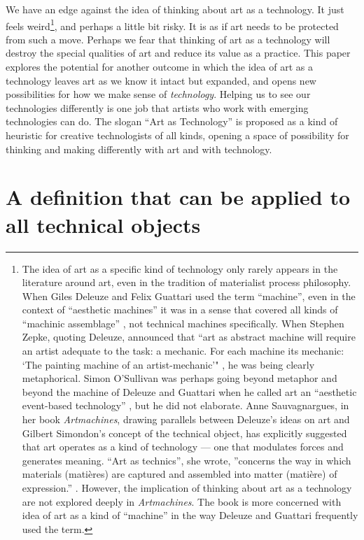 \documentclass[letterpaper]{article}
\begin{document}
    We have an edge against the idea of thinking about art as a technology. It just feels weird\footnote{
        The idea of art as a specific kind of technology only rarely appears in the literature around art, even in the tradition of materialist process philosophy. When Giles Deleuze and Felix Guattari used the term “machine”, even in the context of “aesthetic machines” \citep[p.42]{GuattariChsmss1995} it was in a sense that covered all kinds of “machinic assemblage” \citep[p.41]{GuattariChsmss1995}, not technical machines specifically. When Stephen Zepke, quoting Deleuze, announced that “art as abstract machine will require an artist adequate to the task: a mechanic. For each machine its mechanic: ‘The painting machine of an artist-mechanic’" \citep[p.1]{ZepkeArtAsAbstrctMchn2005}, he was being clearly metaphorical. Simon O'Sullivan was perhaps going beyond metaphor and beyond the machine of Deleuze and Guattari when he called art an “aesthetic event-based technology” \citep[p.202]{ZepkeOSullivanDlzCntmprryArt2010}, but he did not elaborate. Anne Sauvagnargues, in her book \emph{Artmachines}, drawing parallels between Deleuze’s ideas on art and Gilbert Simondon’s concept of the technical object, has explicitly suggested that art operates as a kind of technology — one that modulates forces and generates meaning. “Art as technics”, she wrote, ”concerns the way in which materials (matières) are captured and assembled into matter (matière) of expression.” \citep[pp.74-75]{SauvagnarguesArtmchns2016}. However, the implication of thinking about art as a technology are not explored deeply in \emph{Artmachines}. The book is more concerned with idea of art as a kind of “machine” in the way Deleuze and Guattari frequently used the term.
    }, and perhaps a little bit risky. It is as if art needs to be protected from such a move. Perhaps we fear that thinking of art as a technology will destroy the special qualities of art and reduce its value as a practice. This paper explores the potential for another outcome in which the idea of art as a technology leaves art as we know it intact but expanded, and opens new possibilities for how we make sense of \emph{technology}. Helping us to see our technologies differently is one job that artists who work with emerging technologies can do. The slogan “Art as Technology” is proposed as a kind of heuristic for creative technologists of all kinds, opening a space of possibility for thinking and making differently with art and with technology.

\section{A definition that can be applied to all technical objects} 
\end{document}
